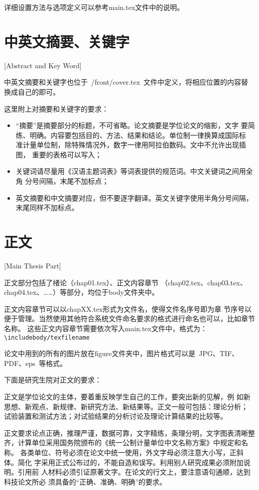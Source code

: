 详细设置方法与选项定义可以参考main.tex文件中的说明。

\section{中英文摘要、关键字}[Abstract and Key Word]

中英文摘要和关键字也位于~{/front/cover.tex}~文件中定义，将相应位置的内容替换成自己的即可。

这里附上对摘要和关键字的要求：
\begin{itemize}
  \item “摘要”是摘要部分的标题，不可省略。论文摘要是学位论文的缩影，文字
        要简练、明确。内容要包括目的、方法、结果和结论。单位制一律换算成国际标
        准计量单位制，除特殊情况外，数字一律用阿拉伯数码。文中不允许出现插图，
        重要的表格可以写入；
  \item 关键词请尽量用《汉语主题词表》等词表提供的规范词。中文关键词之间用全角
        分号间隔，末尾不加标点；
  \item 英文摘要和中文摘要对应，但不要逐字翻译。英文关键字使用半角分号间隔，
        末尾同样不加标点。
\end{itemize}

\section{正文}[Main Thesis Part]

正文部分包括了绪论（chap01.tex）、正文内容章节
（chap02.tex、chap03.tex、chap04.tex、……）等部分，均位于body文件夹中。

正文内容章节可以以chapXX.tex形式为文件名，使得文件名序号即为章
节序号以便于管理。当然使用其他符合系统文件命名要求的格式进行命名也可以，比如章节名称。
这些正文内容章节需要依次写入main.tex文件中，格式为：
\texttt{\textbackslash include{body/texfilename}}

论文中用到的所有的图片放在figure文件夹中，图片格式可以是~JPG、TIF、PDF、eps~等格式。

下面是研究生院对正文的要求：

正文是学位论文的主体，要着重反映学生自己的工作，要突出新的见解，例
如新思想、新观点、新规律、新研究方法、新结果等。正文一般可包括：理论分析；
试验装置和测试方法；对试验结果的分析讨论及理论计算结果的比较等。

正文要求论点正确，推理严谨，数据可靠，文字精练，条理分明，文字图表清晰整
齐，计算单位采用国务院颁布的《统一公制计量单位中文名称方案》中规定和名称。
各类单位、符号必须在论文中统一使用，外文字母必须注意大小写，正斜体。简化
字采用正式公布过的，不能自造和误写。利用别人研究成果必须附加说明。引用前
人材料必须引证原著文字。在论文的行文上，要注意语句通顺，达到科技论文所必
须具备的“正确、准确、明确”的要求。

